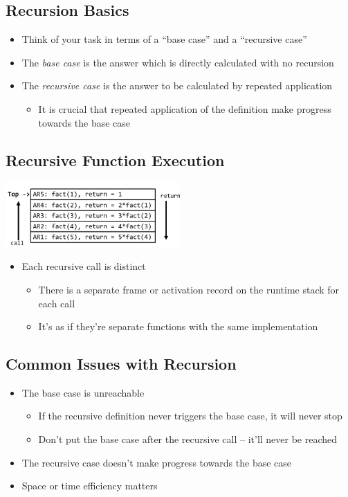 \documentclass[10pt]{article}
\begin{document}
\subsection*{Recursion Basics}
\begin{itemize}
    \item Think of your task in terms of a ``base case'' and a ``recursive case''
    \item The \textit{base case} is the answer which is directly calculated with no recursion
    \item The \textit{recursive case} is the answer to be calculated by repeated application
    \begin{itemize}
        \item It is crucial that repeated application of the definition make progress towards the base case
    \end{itemize}
\end{itemize}

\subsection*{Recursive Function Execution}
\begin{center}
    \includegraphics[width = 0.5\textwidth]{images/img00012}
\end{center}
\begin{itemize}
    \item Each recursive call is distinct
    \begin{itemize}
        \item There is a separate frame or activation record on the runtime stack for each call
        \item It's as if they're separate functions with the same implementation
    \end{itemize}
\end{itemize}

\subsection*{Common Issues with Recursion}
\begin{itemize}
    \item The base case is unreachable
    \begin{itemize}
        \item If the recursive definition never triggers the base case, it will never stop
        \item Don't put the base case after the recursive call -- it'll never be reached
    \end{itemize}
    \item The recursive case doesn't make progress towards the base case
    \item Space or time efficiency matters
\end{itemize}
\end{document}
